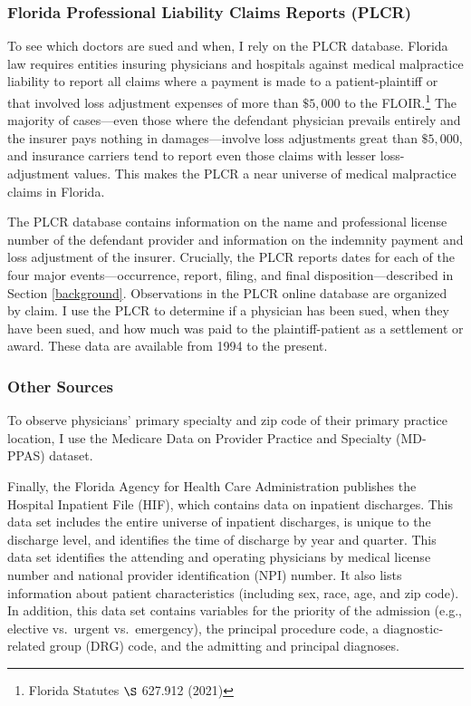 \documentclass[
  12pt,
]{article}
\begin{document}
\hypertarget{florida-professional-liability-claims-reports-plcr}{%
\subsubsection{Florida Professional Liability Claims Reports (PLCR)}\label{florida-professional-liability-claims-reports-plcr}}

To see which doctors are sued and when, I rely on the PLCR database. Florida law requires entities insuring physicians and hospitals against medical malpractice liability to report all claims where a payment is made to a patient-plaintiff or that involved loss adjustment expenses of more than \(\$5,000\) to the FLOIR.\footnote{Florida Statutes \(\S\) 627.912 (2021)} The majority of cases---even those where the defendant physician prevails entirely and the insurer pays nothing in damages---involve loss adjustments great than \(\$5,000\), and insurance carriers tend to report even those claims with lesser loss-adjustment values. This makes the PLCR a near universe of medical malpractice claims in Florida.

The PLCR database contains information on the name and professional license number of the defendant provider and information on the indemnity payment and loss adjustment of the insurer. Crucially, the PLCR reports dates for each of the four major events---occurrence, report, filing, and final disposition---described in Section \ref{background}. Observations in the PLCR online database are organized by claim. I use the PLCR to determine if a physician has been sued, when they have been sued, and how much was paid to the plaintiff-patient as a settlement or award. These data are available from 1994 to the present.

\hypertarget{other-sources}{%
\subsubsection{Other Sources}\label{other-sources}}

To observe physicians' primary specialty and zip code of their primary practice location, I use the Medicare Data on Provider Practice and Specialty (MD-PPAS) dataset.

Finally, the Florida Agency for Health Care Administration publishes the Hospital Inpatient File (HIF), which contains data on inpatient discharges. This data set includes the entire universe of inpatient discharges, is unique to the discharge level, and identifies the time of discharge by year and quarter. This data set identifies the attending and operating physicians by medical license number and national provider identification (NPI) number. It also lists information about patient characteristics (including sex, race, age, and zip code). In addition, this data set contains variables for the priority of the admission (e.g., elective vs.~urgent vs.~emergency), the principal procedure code, a diagnostic-related group (DRG) code, and the admitting and principal diagnoses.
\end{document}
